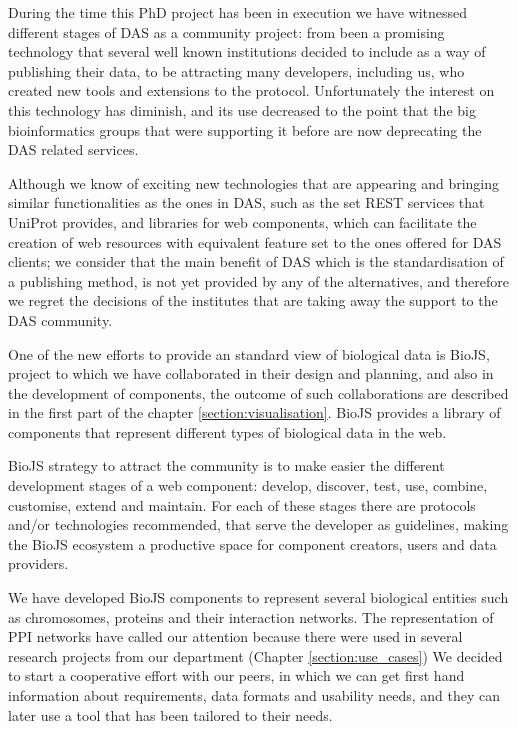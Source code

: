 During the time this PhD project has been in execution we have witnessed different stages of DAS as a community project: from been a promising technology that several well known institutions decided to include as a way of publishing their data, to be attracting many developers, including us, who created new tools and extensions to the protocol. Unfortunately the interest on this technology has diminish, and its use decreased to the point that the big bioinformatics groups that were supporting it before are now deprecating the DAS related services.

Although we know of exciting new technologies that are appearing and bringing similar functionalities as the ones in DAS, such as the set REST services that UniProt provides, and libraries for web components, which can facilitate the creation of web resources with equivalent feature set to the ones offered for DAS clients; we consider that the main benefit of DAS which is the standardisation of a publishing method, is not yet provided by any of the alternatives, and therefore we regret the decisions of the institutes that are taking away the support to the DAS community.

\vspace{5mm}

One of the new efforts to provide an standard view of biological data is BioJS, project to which we have collaborated in their design and planning, and also in the development of components, the outcome of such collaborations are described in the first part of the chapter \ref{section:visualisation}. BioJS provides a library of components that represent different types of biological data in the web. 

BioJS strategy to attract the community is to make easier the different development stages of a web component: develop, discover, test, use, combine, customise, extend and maintain. For each of these stages there are protocols and/or technologies recommended, that serve the developer as guidelines, making the BioJS ecosystem a productive space for component creators, users and data providers.

We have developed BioJS components to represent several biological entities such as chromosomes, proteins and their interaction networks. The representation of PPI networks have called our attention because there were used in several research projects from our department (Chapter \ref{section:use_cases}) We decided to start a cooperative effort with our peers, in which we can get first hand information about requirements, data formats and usability needs, and they can later use a tool that has been tailored to their needs.

